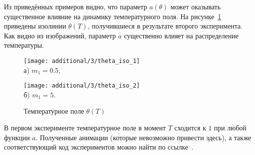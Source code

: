 Из приведённых примеров видно, что параметр $a(\theta)$ может оказывать существенное влияние
на динамику температурного поля.
На рисунке~\ref{fig:4_3:theta_iso_2exp} приведены изолинии $\theta(T)$,
получившиеся в результате второго эксперимента.
Как видно из изображений, параметр $a$ существенно влияет на распределение температуры.
\begin{figure}[h!t]
    \begin{minipage}[b][][b]{0.49\linewidth}
        \centering
        \texttt{[image: additional/3/theta\_iso\_1]} \\ а) $m_1 = 0.5$,
    \end{minipage}
    \hfill
    \begin{minipage}[b][][b]{0.49\linewidth}
        \centering
        \texttt{[image: additional/3/theta\_iso\_2]} \\ б) $m_1 = 5$.
    \end{minipage}
    \caption{Температурное поле $\theta (T)$}
    \label{fig:4_3:theta_iso_2exp}
\end{figure}


В первом эксперименте температурное поле в момент $T$ сходится к $1$ при любой функции $a$.
Полученные анимации (которые невозможно привести здесь), а также
соответствующий код экспериментов можно найти по ссылке~\cite{mesenev-github}.



